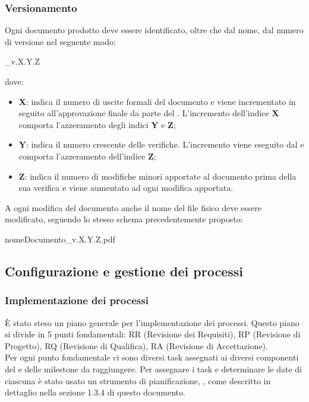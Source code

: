 \subsubsection{Versionamento}
Ogni documento prodotto deve essere identificato, oltre che dal nome, dal numero
di versione nel seguente modo:
\begin{center}
  \_v.X.Y.Z
\end{center}
dove:

\begin{itemize}
  \item \textbf{X}: indica il numero di uscite formali del documento e viene
  incrementato in seguito all'approvazione finale da parte del \textit{\Pm}.
  L'incremento dell'indice \textbf{X} comporta l'azzeramento degli indici
  \textbf{Y} e \textbf{Z};
  \item \textbf{Y}: indica il numero crescente delle verifiche. L'incremento viene 	eseguito dal \textit{\Ver} e comporta l'azzeramento dell'indice \textbf{Z};
  \item \textbf{Z}: indica il numero di modifiche minori apportate al documento
  prima della sua verifica e viene aumentato ad ogni modifica apportata.
  \end{itemize}
A ogni modifica del documento anche il nome del file fisico deve essere
modificato, seguendo lo stesso schema precedentemente proposto:
\begin{center}
  nomeDocumento\_v.X.Y.Z.pdf
\end{center}

\subsection{Configurazione e gestione dei processi}
\subsubsection{Implementazione dei processi}
È stato steso un piano generale per l'implementazione dei processi. Questo piano si divide in 5 punti fondamentali: RR (Revisione dei Requisiti), RP (Revisione di Progetto), RQ (Revisione di Qualifica), RA (Revisione di Accettazione). \\
Per ogni punto fondamentale ci sono diversi task assegnati ai diversi componenti del  e delle milestone da raggiungere. Per assegnare i task e determinare le date di ciascuna  è stato usato un strumento di pianificazione, , come descritto in dettaglio nella sezione 1.3.4 di questo documento.

